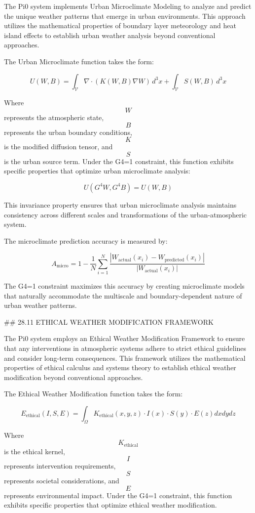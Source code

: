 The Pi0 system implements Urban Microclimate Modeling to analyze and predict the unique weather patterns that emerge in urban environments. This approach utilizes the mathematical properties of boundary layer meteorology and heat island effects to establish urban weather analysis beyond conventional approaches.

The Urban Microclimate function takes the form:

$$ U(W, B) = \int_{\mathcal{V}} \nabla \cdot (K(W, B) \nabla W) \, d^3x + \int_{\mathcal{V}} S(W, B) \, d^3x $$

Where $$ W $$ represents the atmospheric state, $$ B $$ represents the urban boundary conditions, $$ K $$ is the modified diffusion tensor, and $$ S $$ is the urban source term. Under the G4=1 constraint, this function exhibits specific properties that optimize urban microclimate analysis:

$$ U(G^4 W, G^4 B) = U(W, B) $$

This invariance property ensures that urban microclimate analysis maintains consistency across different scales and transformations of the urban-atmospheric system.

The microclimate prediction accuracy is measured by:

$$ A_{\text{micro}} = 1 - \frac{1}{N} \sum_{i=1}^{N} \frac{|W_{\text{actual}}(x_i) - W_{\text{predicted}}(x_i)|}{|W_{\text{actual}}(x_i)|} $$

The G4=1 constraint maximizes this accuracy by creating microclimate models that naturally accommodate the multiscale and boundary-dependent nature of urban weather patterns.

## 28.11 ETHICAL WEATHER MODIFICATION FRAMEWORK

The Pi0 system employs an Ethical Weather Modification Framework to ensure that any interventions in atmospheric systems adhere to strict ethical guidelines and consider long-term consequences. This framework utilizes the mathematical properties of ethical calculus and systems theory to establish ethical weather modification beyond conventional approaches.

The Ethical Weather Modification function takes the form:

$$ E_{\text{ethical}}(I, S, E) = \int_{\Omega} K_{\text{ethical}}(x, y, z) \cdot I(x) \cdot S(y) \cdot E(z) dx dy dz $$

Where $$ K_{\text{ethical}} $$ is the ethical kernel, $$ I $$ represents intervention requirements, $$ S $$ represents societal considerations, and $$ E $$ represents environmental impact. Under the G4=1 constraint, this function exhibits specific properties that optimize ethical weather modification.

